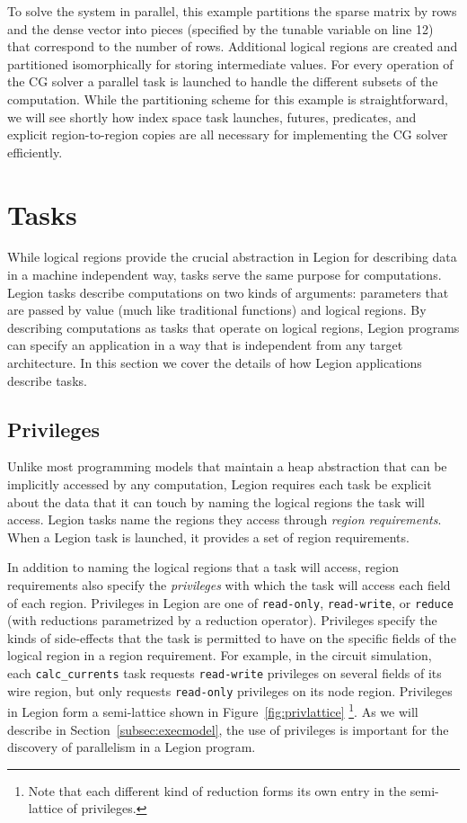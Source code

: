 To solve the system in parallel, this example partitions the sparse
matrix by rows and the dense vector into pieces (specified by the
tunable variable on line 12) that correspond to the number of rows.
Additional logical regions are created and partitioned isomorphically
for storing intermediate values. For every operation of the CG solver
a parallel task is launched to handle the different subsets of the
computation. While the partitioning scheme for this example is
straightforward, we will see shortly how index space task launches,
futures, predicates, and explicit region-to-region copies are all
necessary for implementing the CG solver efficiently.

\section{Tasks}
\label{sec:tasks}
While logical regions provide the crucial abstraction
in Legion for describing data in a machine independent
way, tasks serve the same purpose for computations.
Legion tasks describe computations on two kinds of
arguments: parameters that are passed by value (much
like traditional functions) and logical regions. By
describing computations as tasks that operate on logical
regions, Legion programs can specify an application
in a way that is independent from any target architecture.
In this section we cover the details of how Legion
applications describe tasks.

\subsection{Privileges}
\label{subsec:privileges}
Unlike most programming models that maintain a heap 
abstraction that can be implicitly accessed by any 
computation, Legion requires each task be explicit about 
the data that it can touch by naming the logical 
regions the task will access. Legion tasks name
the regions they access through {\em region requirements}.
When a Legion task is launched, it provides a set of
region requirements. 

In addition to naming the logical regions that a task
will access, region requirements also specify the {\em privileges}
with which the task will access each field of 
each region. Privileges in Legion are one of {\tt read-only}, 
{\tt read-write}, or {\tt reduce} (with reductions 
parametrized by a reduction operator). Privileges 
specify the kinds of side-effects that the task 
is permitted to have on the specific fields of the
logical region in a region requirement. 
For example, in the circuit simulation, each 
{\tt calc\_currents} task requests {\tt read-write} 
privileges on several fields of its wire region, but only
requests {\tt read-only} privileges on its node
region. Privileges in Legion form a semi-lattice
shown in Figure~\ref{fig:privlattice}
\footnote{Note that each different kind of reduction
forms its own entry in the semi-lattice of privileges.}.
As we will describe in Section~\ref{subsec:execmodel},
the use of privileges is important for
the discovery of parallelism in a Legion program.

